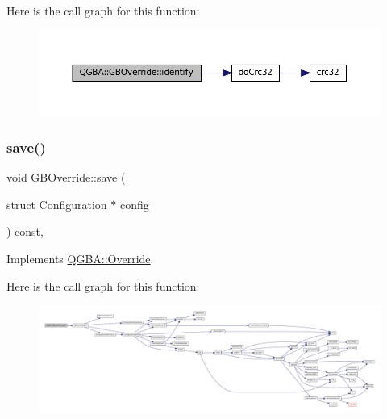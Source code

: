 Here is the call graph for this function\+:
\nopagebreak
\begin{figure}[H]
\begin{center}
\leavevmode
\includegraphics[width=350pt]{class_q_g_b_a_1_1_g_b_override_a287ae6b1d0a643f36652f72e22a1483e_cgraph}
\end{center}
\end{figure}
\mbox{\label{class_q_g_b_a_1_1_g_b_override_ad14c3a566eeeee641c4c78068b483ace}} 
\subsubsection{\texorpdfstring{save()}{save()}}
{\footnotesize\ttfamily void G\+B\+Override\+::save (\begin{DoxyParamCaption}\item[{struct Configuration $\ast$}]{config }\end{DoxyParamCaption}) const\hspace{0.3cm}{\ttfamily [override]}, {\ttfamily [virtual]}}



Implements \mbox{\hyperlink{class_q_g_b_a_1_1_override_aa03c9614ec596b7e2fb15e59483fb99e}{Q\+G\+B\+A\+::\+Override}}.

Here is the call graph for this function\+:
\nopagebreak
\begin{figure}[H]
\begin{center}
\leavevmode
\includegraphics[width=350pt]{class_q_g_b_a_1_1_g_b_override_ad14c3a566eeeee641c4c78068b483ace_cgraph}
\end{center}
\end{figure}



